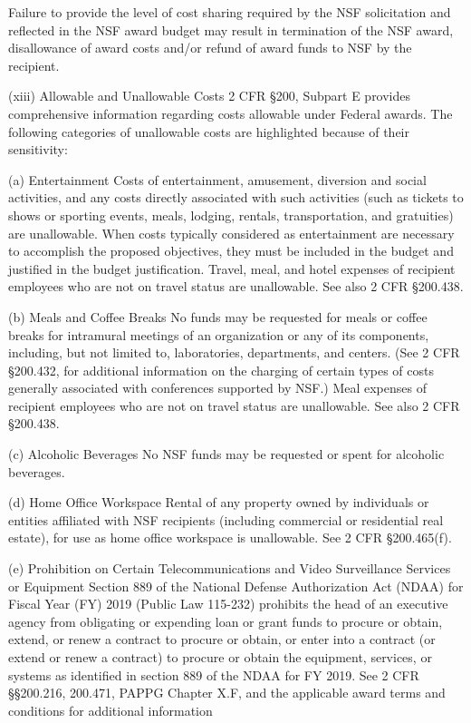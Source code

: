 {Failure to provide the level of cost sharing required by the NSF solicitation and reflected in the NSF award budget may result in termination of the NSF award, disallowance of award costs and/or refund of award funds to NSF by the recipient.

(xiii) Allowable and Unallowable Costs
2 CFR §200, Subpart E provides comprehensive information regarding costs allowable under Federal awards. The following categories of unallowable costs are highlighted because of their sensitivity:

(a) Entertainment
Costs of entertainment, amusement, diversion and social activities, and any costs directly associated with such activities (such as tickets to shows or sporting events, meals, lodging, rentals, transportation, and gratuities) are unallowable. When costs typically considered as entertainment are necessary to accomplish the proposed objectives, they must be included in the budget and justified in the budget justification. Travel, meal, and hotel expenses of recipient employees who are not on travel status are unallowable. See also 2 CFR §200.438.

(b) Meals and Coffee Breaks
No funds may be requested for meals or coffee breaks for intramural meetings of an organization or any of its components, including, but not limited to, laboratories, departments, and centers. (See 2 CFR §200.432, for additional information on the charging of certain types of costs generally associated with conferences supported by NSF.) Meal expenses of recipient employees who are not on travel status are unallowable. See also 2 CFR §200.438.

(c) Alcoholic Beverages
No NSF funds may be requested or spent for alcoholic beverages.

(d) Home Office Workspace
Rental of any property owned by individuals or entities affiliated with NSF recipients (including commercial or residential real estate), for use as home office workspace is unallowable. See 2 CFR §200.465(f).

(e) Prohibition on Certain Telecommunications and Video Surveillance Services or Equipment
Section 889 of the National Defense Authorization Act (NDAA) for Fiscal Year (FY) 2019 (Public Law 115-232) prohibits the head of an executive agency from obligating or expending loan or grant funds to procure or obtain, extend, or renew a contract to procure or obtain, or enter into a contract (or extend or renew a contract) to procure or obtain the equipment, services, or systems as identified in section 889 of the NDAA for FY 2019. See 2 CFR §§200.216, 200.471, PAPPG Chapter X.F, and the applicable award terms and conditions for additional information
}
